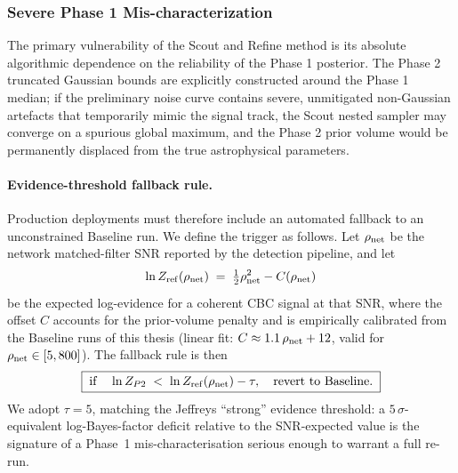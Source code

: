 \documentclass[12pt]{article}
\begin{document}
\subsubsection{Severe Phase 1 Mis-characterization}
\label{sec:fallback}
The primary vulnerability of the Scout and Refine method is its absolute algorithmic dependence on the reliability of the Phase 1 posterior. The Phase 2 truncated Gaussian bounds are explicitly constructed around the Phase 1 median; if the preliminary noise curve contains severe, unmitigated non-Gaussian artefacts that temporarily mimic the signal track, the Scout nested sampler may converge on a spurious global maximum, and the Phase 2 prior volume would be permanently displaced from the true astrophysical parameters.

\paragraph{Evidence-threshold fallback rule.}
Production deployments must therefore include an automated fallback to an unconstrained Baseline run. We define the trigger as follows. Let $\rho_{\rm net}$ be the network matched-filter SNR reported by the detection pipeline, and let
\begin{equation}
    \ln Z_{\rm ref}(\rho_{\rm net}) \;=\; \tfrac{1}{2}\rho_{\rm net}^2 - C(\rho_{\rm net})
\end{equation}
be the expected log-evidence for a coherent CBC signal at that SNR, where the offset $C$ accounts for the prior-volume penalty and is empirically calibrated from the Baseline runs of this thesis (linear fit: $C \approx 1.1\,\rho_{\rm net} + 12$, valid for $\rho_{\rm net} \in [5, 800]$). The fallback rule is then
\begin{equation}
    \boxed{\;\mathrm{if}\quad \ln Z_{P2} \;<\; \ln Z_{\rm ref}(\rho_{\rm net}) - \tau, \quad \text{revert to Baseline.}\;}
    \label{eq:fallback}
\end{equation}
We adopt $\tau = 5$, matching the Jeffreys ``strong'' evidence threshold: a $5\,\sigma$-equivalent log-Bayes-factor deficit relative to the SNR-expected value is the signature of a Phase~1 mis-characterisation serious enough to warrant a full re-run.
\end{document}
